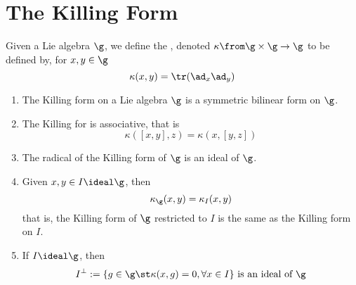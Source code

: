 \documentclass[11pt,leqno,oneside]{amsart}
\numberwithin{thm}{section}
\begin{document}
\section{The Killing Form}
\begin{defn}
  Given a Lie algebra \(\g\), we define the , denoted \(\kappa \from \g \times \g \to \g\) to be
  defined by, for \(x,y \in \g\) \[
    \kappa(x,y) = \tr(\ad_x \ad_y)
  \]
\end{defn}
\begin{prop}
  \begin{enumerate}
  \item The Killing form on a Lie algebra \(\g\) is a symmetric bilinear
  form on \(\g\). 
  \item The Killing for is associative, that is \[
    \kappa([x,y],z) = \kappa(x,[y,z])
  \]
  \item The radical of the Killing form of \(\g\) is an ideal of
    \(\g\).
  \item Given \(x,y \in I \ideal \g\), then \[
      \kappa_\g(x,y) = \kappa_I(x,y)
    \]
    that is, the Killing form of \(\g\) restricted to \(I\) is the
    same as the Killing form on \(I\).
  \item If \(I \ideal \g\), then \[
      I^\perp := \{g \in \g \st \kappa(x,g) = 0, \forall x \in I\}
      \text{ is an ideal of }\g
    \]
  \end{enumerate}
\end{prop}
\end{document}
